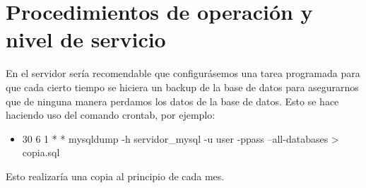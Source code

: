 \section{Procedimientos de operación y nivel de servicio}

En el servidor sería recomendable que configurásemos una tarea programada para que cada cierto tiempo se hiciera un backup de la base de datos para asegurarnos que de ninguna manera perdamos los datos de la base de datos. Esto se hace haciendo uso del comando crontab, por ejemplo:

\begin{itemize}
\item 30 6 1 * * mysqldump -h servidor\_mysql -u user -ppass --all-databases > copia.sql
\end{itemize}

Esto realizaría una copia al principio de cada mes.

